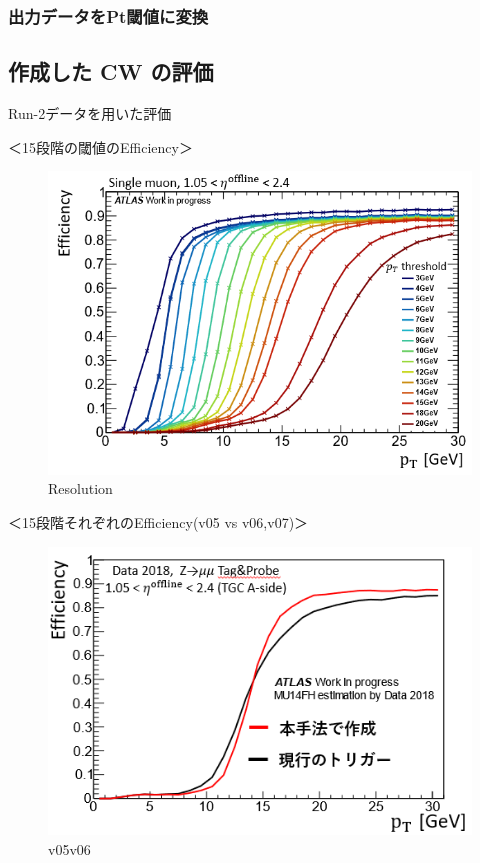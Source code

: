 \subsubsection{出力データをPt閾値に変換}

\subsection{作成した CW の評価}
Run-2データを用いた評価

＜15段階の閾値のEfficiency＞
\begin{figure}[tb]
  \centering
  \includegraphics[clip, width=14cm]{fig/4/v07_15_Eff.png}
  \caption{Resolution}
  \label{fig:Resolution}
\end{figure}


＜15段階それぞれのEfficiency(v05 vs v06,v07)＞\\
\begin{figure}[tb]
  \centering
  \includegraphics[clip, width=14cm]{fig/4/hikaku_v05_v06.png}
  \caption{v05v06}
  \label{fig:Resolution}
\end{figure}

